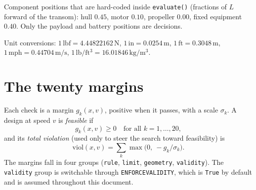 \documentclass[11pt,a4paper]{article}
\renewcommand{\_}{\textunderscore\allowbreak}
\newcommand{\code}[1]{\texttt{#1}}
\begin{document}
Component positions that are hard-coded inside \code{evaluate()} (fractions of $L$ forward of the transom):
hull $0.45$, motor $0.10$, propeller $0.00$, fixed equipment $0.40$. Only the payload and battery positions are decisions.

Unit conversions: $1\,\mathrm{lbf}=4.44822162\,\mathrm N$, $1\,\mathrm{in}=0.0254\,\mathrm m$,
$1\,\mathrm{ft}=0.3048\,\mathrm m$, $1\,\mathrm{mph}=0.44704\,\mathrm{m/s}$, $1\,\mathrm{lb/ft^3}=16.01846\,\mathrm{kg/m^3}$.


\section{The twenty margins}
\label{sec:constraints}

Each check is a margin $g_k(x,v)$, positive when it passes, with a scale $\sigma_k$. A design at speed $v$ is
\emph{feasible} if
\begin{equation}
  g_k(x,v) \ge 0 \quad \text{for all } k = 1,\dots,20,
  \label{eq:feasible}
\end{equation}
and its \emph{total violation} (used only to steer the search toward feasibility) is
\begin{equation}
  \mathrm{viol}(x,v) = \sum_k \max\!\bigl(0,\ -g_k/\sigma_k\bigr).
  \label{eq:violation}
\end{equation}
The margins fall in four groups (\code{rule}, \code{limit}, \code{geometry}, \code{validity}). The \code{validity}
group is switchable through \code{ENFORCE\_VALIDITY}, which is \code{True} by default and is assumed throughout this document.
\end{document}
